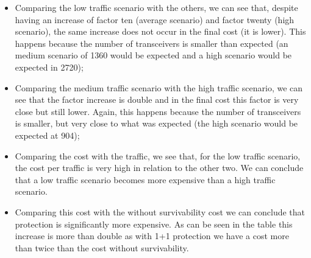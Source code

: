 \begin{itemize}
    \item Comparing the low traffic scenario with the others, we can see that, despite having an increase of factor ten (average scenario) and factor twenty (high scenario), the same increase does not occur in the final cost (it is lower). This happens because the number of transceivers is smaller than expected (an medium scenario of 1360 would be expected and a high scenario would be expected in 2720);
    \item Comparing the medium traffic scenario with the high traffic scenario, we can see that the factor increase is double and in the final cost this factor is very close but still lower. Again, this happens because the number of transceivers is smaller, but very close to what was expected (the high scenario would be expected at 904);
    \item Comparing the cost with the traffic, we see that, for the low traffic scenario, the cost per traffic is very high in relation to the other two. We can conclude that a low traffic scenario becomes more expensive than a high traffic scenario.
    \item Comparing this cost with the without survivability cost we can conclude that protection is significantly more expensive. As can be seen in the table this increase is more than double as with 1+1 protection we have a cost more than twice than the cost without survivability.
\end{itemize}

